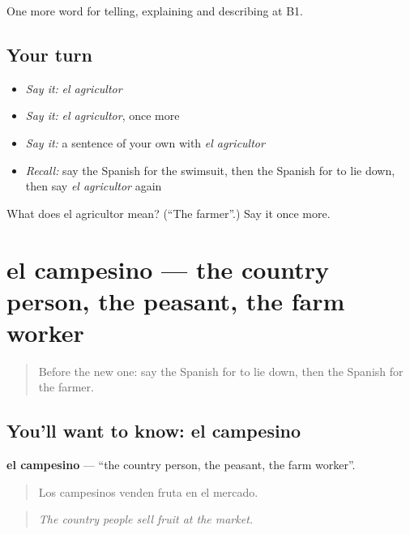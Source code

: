 \begin{grammarlens}[title={What you've built}]
One more word for telling, explaining and describing at B1.
\end{grammarlens}

\subsection*{Your turn}
\begin{itemize}
\raggedright
  \item \emph{Say it:} \emph{el agricultor}
  \item \emph{Say it:} \emph{el agricultor}, once more
  \item \emph{Say it:} a sentence of your own with \emph{el agricultor}
  \item \emph{Recall:} say the Spanish for the swimsuit, then the Spanish for to lie down, then say \emph{el agricultor} again
\end{itemize}

\begin{tcolorbox}[breakable,colback=teal!4,colframe=teal!35!black,title={Before you move on}]
What does el agricultor mean? (\textquotedblleft{}The farmer\textquotedblright{}.) Say it once more.
\end{tcolorbox}
\section[el campesino]{el campesino — the country person, the peasant, the farm worker}

\label{lesson:ES-C691-campesino}



\begin{quote}
Before the new one: say the Spanish for to lie down, then the Spanish for the farmer.
\end{quote}

\subsection*{You'll want to know: el campesino}
\textbf{el campesino} — \textquotedblleft{}the country person, the peasant, the farm worker\textquotedblright{}.

\begin{quote}
Los campesinos venden fruta en el mercado.
\end{quote}

\begin{quote}
\emph{The country people sell fruit at the market.}
\end{quote}

